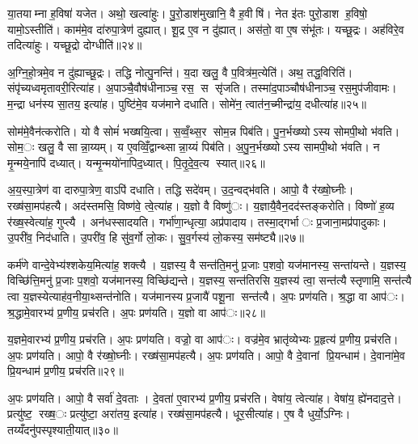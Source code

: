 या॒तयाम्ना ह॒विषा॑ यजेत। अथो॒ खल्वा॑हुः। पु॒रो॒डाश॑मुखानि॒ वै ह॒वीषि॑। नेत इ॑तः पुरो॒डाश ह॒विषो॒ यामो॒ऽस्तीति॑। काम॑मे॒व दा॑रुपा॒त्रेण॑ दुह्यात्। शू॒द्र ए॒व न दु॑ह्यात्। अस॑तो॒ वा ए॒ष संभू॑तः। यच्छू॒द्रः। अह॑विरे॒व तदित्या॑हुः। यच्छू॒द्रो दोग्धीति॑॥२४॥

अ॒ग्नि॒हो॒त्रमे॒व न दु॑ह्याच्छू॒द्रः। तद्धि नोत्पु॒नन्ति॑। य॒दा खलु॒ वै प॒वित्र॑म॒त्येति॑। अथ॒ तद्ध॒विरिति॑। संपृ॑च्यध्वमृतावरी॒रित्या॑ह। अ॒पाञ्चै॒वौष॑धीनाञ्च॒ रस॒ स सृ॑जति। तस्मा॑द॒पाञ्चौष॑धीनाञ्च॒ रस॒मुप॑जीवामः। म॒न्द्रा धन॑स्य सा॒तय॒ इत्या॑ह। पुष्टि॑मे॒व यज॑माने दधाति। सोमे॑न॒ त्वात॑न॒च्मीन्द्रा॑य॒ दधीत्या॑ह॥२५॥

सोम॑मे॒वैन॑त्करोति। यो वै सोमं॑ भख्षयि॒त्वा। स॒व्वँ॒थ्स॒र सोम॒न्न पिब॑ति। पु॒न॒र्भख्ष्योऽस्य सोमपी॒थो भ॑वति। सोम॒ः खलु॒ वै सान्ना॒य्यम्। य ए॒वव्विँ॒द्वान्थ्सान्ना॒य्यं पिब॑ति। अ॒पु॒न॒र्भख्ष्योऽस्य सामपी॒थो भ॑वति। न मृ॒न्मये॒नापि॑ दध्यात्। यन्मृ॒न्मयो॑नापिद॒ध्यात्। पि॒तृ॒दे॒व॒त्य स्यात्॥२६॥

अ॒य॒स्पा॒त्रेण॑ वा दारुपा॒त्रेण॒ वाऽपि॑ दधाति। तद्धि सदे॑वम्। उ॒द॒न्वद्भ॑वति। आपो॒ वै र॑ख्षो॒घ्नीः। रख्ष॑सा॒मप॑हत्यै। अद॑स्तमसि॒ विष्ण॑वे॒ त्वे॒त्या॑ह। य॒ज्ञो वै विष्णु॑ः। य॒ज्ञायै॒वैन॒दद॑स्तङ्करोति। विष्णो॑ ह॒व्य र॑ख्ष॒स्वेत्या॑ह॒ गुप्त्यै। अन॑धस्सादयति। गर्भा॑णा॒न्धृत्या॒ अप्र॑पादाय। तस्मा॒द्गर्भाः प्र॒जाना॒मप्र॑पादुकाः। उ॒परी॑व॒ निद॑धाति। उ॒परी॑व॒ हि सु॑व॒र्गो लो॒कः। सु॒व॒र्गस्य॑ लो॒कस्य॒ सम॑ष्ट्यै॥२७॥


कर्म॑णे वान्दे॒वेभ्य॑श्शकेय॒मित्या॑ह॒ शक्त्यै। य॒ज्ञस्य॒ वै सन्त॑ति॒मनु॑ प्र॒जाः प॒शवो॒ यज॑मानस्य॒ सन्ता॑यन्ते। य॒ज्ञस्य॒ विच्छि॑त्ति॒मनु॑ प्र॒जाः प॒शवो॒ यज॑मानस्य॒ विच्छि॑द्यन्ते। य॒ज्ञस्य॒ सन्त॑तिरसि य॒ज्ञस्य॑ त्वा॒ सन्त॑त्यै स्तृणामि॒ सन्त॑त्यै त्वा य॒ज्ञस्येत्याह॑व॒नीया॒थ्सन्त॑नोति। यज॑मानस्य प्र॒जायै॑ पशू॒ना सन्त॑त्यै। अ॒पः प्रण॑यति। श्र॒द्धा वा आप॑ः। श्र॒द्धामे॒वारभ्य॑ प्र॒णीय॒ प्रच॑रति। अ॒पः प्रण॑यति। य॒ज्ञो वा आप॑ः॥२८॥

य॒ज्ञमे॒वारभ्य॑ प्र॒णीय॒ प्रच॑रति। अ॒पः प्रण॑यति। वज्रो॒ वा आप॑ः। वज्र॑मे॒व भ्रातृ॑व्येभ्यः प्र॒हृत्य॑ प्र॒णीय॒ प्रच॑रति। अ॒पः प्रण॑यति। आपो॒ वै र॑ख्षो॒घ्नीः। रख्ष॑सा॒मप॑हत्यै। अ॒पः प्रण॑यति। आपो॒ वै दे॒वानां प्रि॒यन्धाम॑। दे॒वाना॑मे॒व प्रि॒यन्धाम॑ प्र॒णीय॒ प्रच॑रति॥२९॥

अ॒पः प्रण॑यति। आपो॒ वै सर्वा॑ दे॒वताः। दे॒वता॑ ए॒वारभ्य॑ प्र॒णीय॒ प्रच॑रति। वेषा॑य॒ त्वेत्या॑ह। वेषा॑य॒ ह्ये॑नदाद॒त्ते। प्रत्यु॑ष्ट॒ रख्ष॒ः प्रत्यु॑ष्टा॒ अरा॑तय॒ इत्या॑ह। रख्ष॑सा॒मप॑हत्यै। धूर॒सीत्या॑ह। ए॒ष वै धुर्यो॒ऽग्निः। तय्यँदनु॑पस्पृश्याती॒यात्॥३०॥

